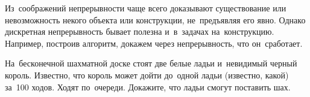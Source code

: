 Из~соображений непрерывности чаще всего доказывают существование или
невозможность некого объекта или конструкции, не~предъявляя его явно.
Однако дискретная непрерывность бывает полезна и~в~задачах на~конструкцию.
Например, построив алгоритм, докажем через непрерывность, что он~сработает.

\begin{problems}

\item
На~бесконечной шахматной доске стоят две белые ладьи и~невидимый черный король.
Известно, что король может дойти до~одной ладьи (известно, какой) за~100 ходов.
Ходят по~очереди.
Докажите, что ладьи смогут поставить шах.

\end{problems}

